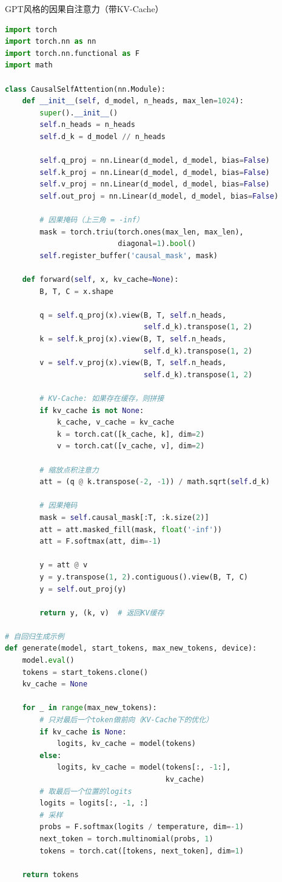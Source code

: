 \begin{mycode}{GPT风格的因果自注意力（带KV-Cache）}
\begin{lstlisting}[language=Python]
import torch
import torch.nn as nn
import torch.nn.functional as F
import math

class CausalSelfAttention(nn.Module):
    def __init__(self, d_model, n_heads, max_len=1024):
        super().__init__()
        self.n_heads = n_heads
        self.d_k = d_model // n_heads

        self.q_proj = nn.Linear(d_model, d_model, bias=False)
        self.k_proj = nn.Linear(d_model, d_model, bias=False)
        self.v_proj = nn.Linear(d_model, d_model, bias=False)
        self.out_proj = nn.Linear(d_model, d_model, bias=False)

        # 因果掩码（上三角 = -inf）
        mask = torch.triu(torch.ones(max_len, max_len),
                          diagonal=1).bool()
        self.register_buffer('causal_mask', mask)

    def forward(self, x, kv_cache=None):
        B, T, C = x.shape

        q = self.q_proj(x).view(B, T, self.n_heads,
                                self.d_k).transpose(1, 2)
        k = self.k_proj(x).view(B, T, self.n_heads,
                                self.d_k).transpose(1, 2)
        v = self.v_proj(x).view(B, T, self.n_heads,
                                self.d_k).transpose(1, 2)

        # KV-Cache: 如果存在缓存，则拼接
        if kv_cache is not None:
            k_cache, v_cache = kv_cache
            k = torch.cat([k_cache, k], dim=2)
            v = torch.cat([v_cache, v], dim=2)

        # 缩放点积注意力
        att = (q @ k.transpose(-2, -1)) / math.sqrt(self.d_k)

        # 因果掩码
        mask = self.causal_mask[:T, :k.size(2)]
        att = att.masked_fill(mask, float('-inf'))
        att = F.softmax(att, dim=-1)

        y = att @ v
        y = y.transpose(1, 2).contiguous().view(B, T, C)
        y = self.out_proj(y)

        return y, (k, v)  # 返回KV缓存

# 自回归生成示例
def generate(model, start_tokens, max_new_tokens, device):
    model.eval()
    tokens = start_tokens.clone()
    kv_cache = None

    for _ in range(max_new_tokens):
        # 只对最后一个token做前向（KV-Cache下的优化）
        if kv_cache is None:
            logits, kv_cache = model(tokens)
        else:
            logits, kv_cache = model(tokens[:, -1:],
                                     kv_cache)
        # 取最后一个位置的logits
        logits = logits[:, -1, :]
        # 采样
        probs = F.softmax(logits / temperature, dim=-1)
        next_token = torch.multinomial(probs, 1)
        tokens = torch.cat([tokens, next_token], dim=1)

    return tokens
\end{lstlisting}
\end{mycode}


